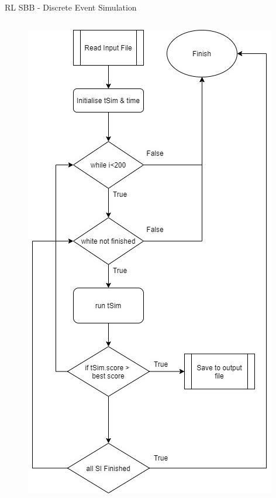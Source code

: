 \documentclass[aspectratio=169]{beamer}
\begin{document}
\begin{frame}{RL SBB - Discrete Event Simulation}
    \begin{columns}[T, onlytextwidth]
        \begin{column}{0.2\textwidth}
            \begin{figure}
                \centering
                \includegraphics[width=\textwidth]{assets/RL/tSim.jpg}

\end{figure}
\end{column}
\end{columns}
\end{frame}
\end{document}
